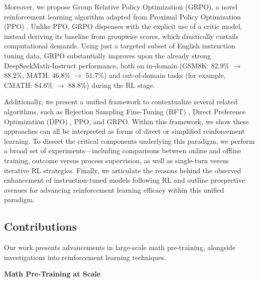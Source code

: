 Moreover, we propose Group Relative Policy Optimization (GRPO), a novel reinforcement learning algorithm adapted from Proximal Policy Optimization (PPO) \citep{schulman2017proximal}. Unlike PPO, GRPO dispenses with the explicit use of a critic model, instead deriving its baseline from groupwise scores, which drastically curtails computational demands. Using just a targeted subset of English instruction tuning data, GRPO substantially improves upon the already strong DeepSeekMath-Instruct performance, both on in-domain (GSM8K: 82.9\% $\rightarrow$ 88.2\%, MATH: 46.8\% $\rightarrow$ 51.7\%) and out-of-domain tasks (for example, CMATH: 84.6\% $\rightarrow$ 88.8\%) during the RL stage. 

Additionally, we present a unified framework to contextualize several related algorithms, such as Rejection Sampling Fine-Tuning (RFT) \citep{yuan2023scaling}, Direct Preference Optimization (DPO) \citep{dpo}, PPO, and GRPO. Within this framework, we show these approaches can all be interpreted as forms of direct or simplified reinforcement learning. To dissect the critical components underlying this paradigm, we perform a broad set of experiments—including comparisons between online and offline training, outcome versus process supervision, as well as single-turn versus iterative RL strategies. Finally, we articulate the reasons behind the observed enhancement of instruction-tuned models following RL and outline prospective avenues for advancing reinforcement learning efficacy within this unified paradigm.

\subsection{Contributions}
Our work presents advancements in large-scale math pre-training, alongside investigations into reinforcement learning techniques.

\textbf{Math Pre-Training at Scale}

